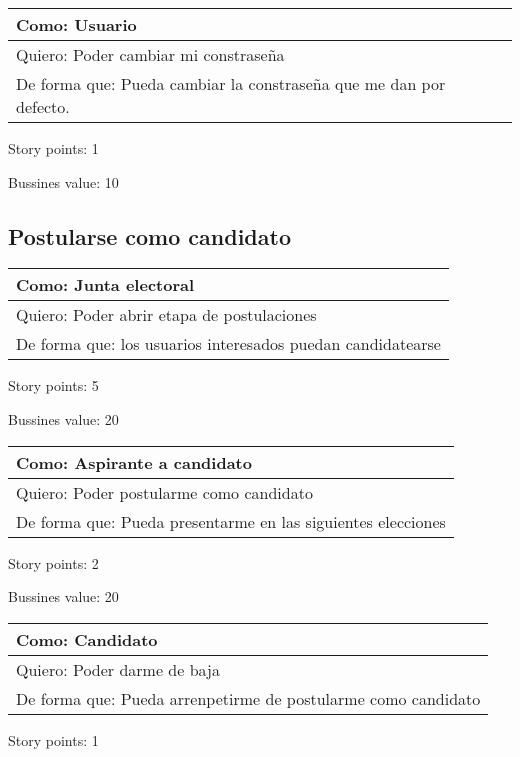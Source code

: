 \bigskip

\begin{tabular}{|l|}
\hline
Como: Usuario\\
\hline
Quiero: Poder cambiar mi constrase\~na\\
\hline
De forma que: Pueda cambiar la constrase\~na que me dan por defecto.\\
\hline
\end{tabular}

\medskip
Story points: 1

\medskip
Bussines value: 10


\bigskip


\subsection*{Postularse como candidato}

\begin{tabular}{|l|}
\hline
Como: Junta electoral\\
\hline
Quiero: Poder abrir etapa de postulaciones\\
\hline
De forma que: los usuarios interesados puedan candidatearse \\
\hline
\end{tabular}

\medskip
Story points: 5

\medskip
Bussines value: 20

\bigskip

\begin{tabular}{|l|}
\hline
Como: Aspirante a candidato\\
\hline
Quiero: Poder postularme como candidato\\
\hline
De forma que: Pueda presentarme en las siguientes elecciones \\
\hline
\end{tabular}

\medskip
Story points: 2

\medskip
Bussines value: 20


\bigskip

\begin{tabular}{|l|}
\hline
Como: Candidato\\
\hline
Quiero: Poder darme de baja\\
\hline
De forma que: Pueda arrenpetirme de postularme como candidato \\
\hline
\end{tabular}

\medskip
Story points: 1

